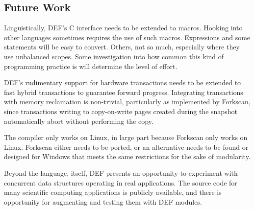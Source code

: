 \subsection{Future Work}

Linguistically, DEF's C interface needs to be extended to macros.  Hooking into other languages sometimes requires the use of such macros.  Expressions and some statements will be easy to convert.  Others, not so much, especially where they use unbalanced scopes.  Some investigation into how common this kind of programming practice is will determine the level of effort.

DEF's rudimentary support for hardware transactions needs to be extended to fast hybrid transactions to guarantee forward progress.  Integrating transactions with memory reclamation is non-trivial, particularly as implemented by Forkscan, since transactions writing to copy-on-write pages created during the snapshot automatically abort without performing the copy.

The compiler only works on Linux, in large part because Forkscan only works on Linux.  Forkscan either needs to be ported, or an alternative needs to be found or designed for Windows that meets the same restrictions for the sake of modularity.

Beyond the language, itself, DEF presents an opportunity to experiment with concurrent data structures operating in real applications.  The source code for many scientific computing applications is publicly available, and there is opportunity for augmenting and testing them with DEF modules.
